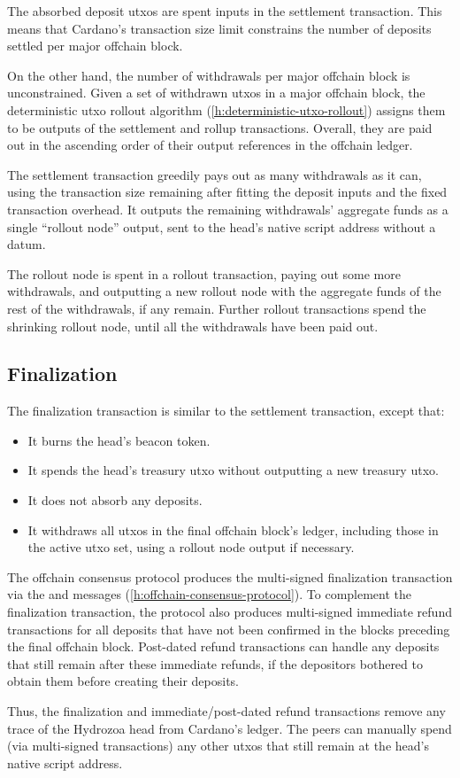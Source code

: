 \documentclass[../hydrozoa.tex]{subfiles}
\begin{document}
The absorbed deposit utxos are spent inputs in the settlement transaction.
This means that Cardano's transaction size limit constrains the number of deposits settled per major offchain block.

On the other hand, the number of withdrawals per major offchain block is unconstrained.
Given a set of withdrawn utxos in a major offchain block, the deterministic utxo rollout algorithm (\cref{h:deterministic-utxo-rollout}) assigns them to be outputs of the settlement and rollup transactions.
Overall, they are paid out in the ascending order of their output references in the offchain ledger.

The settlement transaction greedily pays out as many withdrawals as it can, using the transaction size remaining after fitting the deposit inputs and the fixed transaction overhead.
It outputs the remaining withdrawals' aggregate funds as a single ``rollout node'' output, sent to the head's native script address without a datum.

The rollout node is spent in a rollout transaction, paying out some more withdrawals, and outputting a new rollout node with the aggregate funds of the rest of the withdrawals, if any remain.
Further rollout transactions spend the shrinking rollout node, until all the withdrawals have been paid out.

\subsection{Finalization}%
\label{h:multisig-finalize}
The finalization transaction is similar to the settlement transaction, except that:
\begin{itemize}
  \item It burns the head's beacon token.
  \item It spends the head's treasury utxo without outputting a new treasury utxo.
  \item It does not absorb any deposits.
  \item It withdraws all utxos in the final offchain block's ledger, including those in the active utxo set, using a rollout node output if necessary.
\end{itemize}

The offchain consensus protocol produces the multi-signed finalization transaction via the  and  messages (\cref{h:offchain-consensus-protocol}).
To complement the finalization transaction, the protocol also produces multi-signed immediate refund transactions for all deposits that have not been confirmed in the blocks preceding the final offchain block.
Post-dated refund transactions can handle any deposits that still remain after these immediate refunds, if the depositors bothered to obtain them before creating their deposits.

Thus, the finalization and immediate/post-dated refund transactions remove any trace of the Hydrozoa head from Cardano's ledger.
The peers can manually spend (via multi-signed transactions) any other utxos that still remain at the head's native script address.
\end{document}
